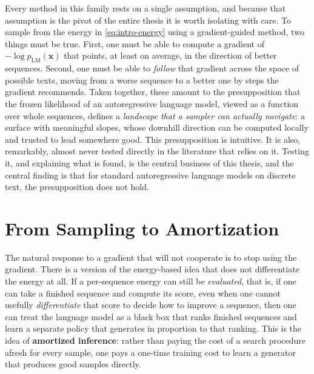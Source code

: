 Every method in this family rests on a single assumption, and because that assumption is the pivot of the entire thesis it is worth isolating with care. To sample from the energy in \eqref{eq:intro-energy} using a gradient-guided method, two things must be true. First, one must be able to compute a gradient of $-\log p_{\text{LM}}(\bm{x})$ that points, at least on average, in the direction of better sequences. Second, one must be able to \emph{follow} that gradient across the space of possible texts, moving from a worse sequence to a better one by steps the gradient recommends. Taken together, these amount to the presupposition that the frozen likelihood of an autoregressive language model, viewed as a function over whole sequences, defines a \emph{landscape that a sampler can actually navigate}: a surface with meaningful slopes, whose downhill direction can be computed locally and trusted to lead somewhere good. This presupposition is intuitive. It is also, remarkably, almost never tested directly in the literature that relies on it. Testing it, and explaining what is found, is the central business of this thesis, and the central finding is that for standard autoregressive language models on discrete text, the presupposition does not hold.

\section{From Sampling to Amortization}
\label{sec:intro-amortize}

The natural response to a gradient that will not cooperate is to stop using the gradient. There is a version of the energy-based idea that does not differentiate the energy at all. If a per-sequence energy can still be \emph{evaluated}, that is, if one can take a finished sequence and compute its score, even when one cannot usefully \emph{differentiate} that score to decide how to improve a sequence, then one can treat the language model as a black box that ranks finished sequences and learn a separate policy that generates in proportion to that ranking. This is the idea of \textbf{amortized inference}: rather than paying the cost of a search procedure afresh for every sample, one pays a one-time training cost to learn a generator that produces good samples directly.

